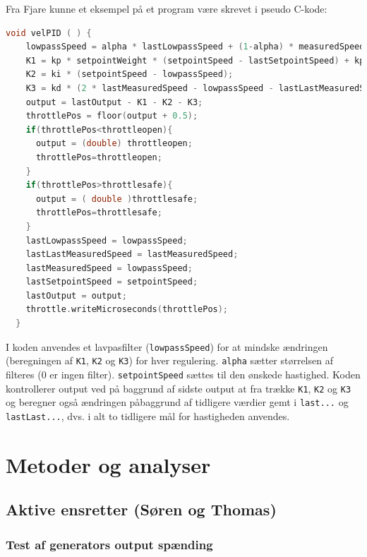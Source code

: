 Fra Fjare\autocite{pid1} kunne et eksempel på et program være skrevet i pseudo C-kode:
\begin{lstlisting}[language=C,basicstyle=\ttfamily,label={lst:pid1}]
  void velPID ( ) {
    lowpassSpeed = alpha * lastLowpassSpeed + (1-alpha) * measuredSpeed;
    K1 = kp * setpointWeight * (setpointSpeed - lastSetpointSpeed) + kp * (lastMeasuredSpeed - lowpassSpeed);
    K2 = ki * (setpointSpeed - lowpassSpeed);
    K3 = kd * (2 * lastMeasuredSpeed - lowpassSpeed - lastLastMeasuredSpeed);
    output = lastOutput - K1 - K2 - K3;
    throttlePos = floor(output + 0.5);
    if(throttlePos<throttleopen){
      output = (double) throttleopen;
      throttlePos=throttleopen;
    }
    if(throttlePos>throttlesafe){
      output = ( double )throttlesafe;
      throttlePos=throttlesafe;
    }
    lastLowpassSpeed = lowpassSpeed;
    lastLastMeasuredSpeed = lastMeasuredSpeed;
    lastMeasuredSpeed = lowpassSpeed;
    lastSetpointSpeed = setpointSpeed;
    lastOutput = output;
    throttle.writeMicroseconds(throttlePos);
  }
\end{lstlisting}

I koden anvendes et lavpasfilter (\lstinline{lowpassSpeed}) for at mindske ændringen (beregningen af \lstinline{K1}, \lstinline{K2} og \lstinline{K3}) for hver regulering. \lstinline{alpha} sætter størrelsen af filteres (0 er ingen filter). \lstinline{setpointSpeed} sættes til den ønskede hastighed. Koden kontrollerer output ved på baggrund af sidste output at fra trække \lstinline{K1}, \lstinline{K2} og \lstinline{K3} og beregner også ændringen påbaggrund af tidligere værdier gemt i \lstinline{last...} og \lstinline{lastLast...}, dvs. i alt to tidligere mål for hastigheden anvendes.


\chapter[Metoder]{Metoder og analyser}
\label{sec:metode}

\section{Aktive ensretter (Søren og Thomas)}
\label{sec:aktive-ensr-soren}

\subsection{Test af generators output spænding}
\label{sec:test-af-generators}

